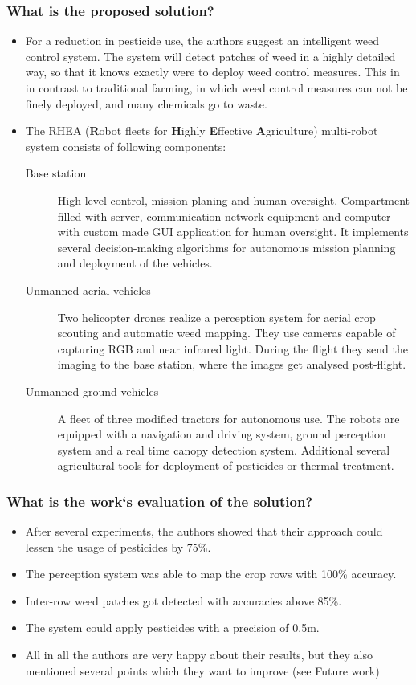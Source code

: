     \subsubsection*{What is the proposed solution?}
    \begin{itemize}
        \item For a reduction in pesticide use, the authors suggest an intelligent weed control system. The system will detect patches of weed in a highly detailed way, so that it knows exactly were to deploy weed control measures. This in in contrast to traditional farming, in which weed control measures can not be finely deployed, and many chemicals go to waste.
        \item The RHEA (\textbf{R}obot fleets for \textbf{H}ighly \textbf{E}ffective \textbf{A}griculture) multi-robot system consists of following components: \ \begin{description}
            \item[Base station]  High level control, mission planing and human oversight. Compartment filled with server, communication network equipment and computer with custom made GUI application for human oversight. It implements several decision-making algorithms for autonomous mission planning and deployment of the vehicles.
            \item[Unmanned aerial vehicles] Two helicopter drones realize a perception system for aerial crop scouting and automatic weed mapping. They use cameras capable of capturing RGB and near infrared light. During the flight they send the imaging to the base station, where the images get analysed post-flight.
            \item[Unmanned ground vehicles] A fleet of three modified tractors for autonomous use. The robots are equipped with a navigation and driving system, ground perception system and a real time canopy detection system. Additional several agricultural tools for deployment of pesticides or thermal treatment.
        \end{description}
    \end{itemize}
    \subsubsection*{What is the work`s evaluation of the solution?}
    \begin{itemize}
        \item After several experiments, the authors showed that their approach could lessen the usage of pesticides by 75\%.
        \item The perception system was able to map the crop rows with 100\% accuracy.
        \item Inter-row weed patches got detected with accuracies above 85\%.
        \item The system could apply pesticides with a precision of 0.5m.
        \item All in all the authors are very happy about their results, but they also mentioned several points which they want to improve (see Future work)
    \end{itemize}
